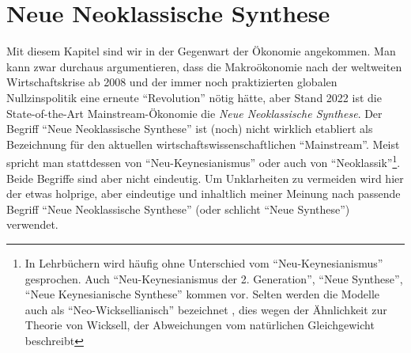 %
%
%

\chapter{Neue Neoklassische Synthese}
\label{Neue Neoklassische Synthese}

Mit diesem Kapitel sind wir in der Gegenwart der Ökonomie angekommen. Man kann zwar durchaus argumentieren, dass die Makroökonomie nach der weltweiten Wirtschaftskrise ab 2008 und der immer noch praktizierten globalen Nullzinspolitik eine erneute "`Revolution"' nötig hätte, aber Stand 2022 ist die State-of-the-Art Mainstream-Ökonomie die \textit{Neue Neoklassische Synthese}. Der Begriff "`Neue Neoklassische Synthese"' ist (noch) nicht wirklich etabliert als Bezeichnung für den aktuellen wirtschaftswissenschaftlichen "`Mainstream"'. Meist spricht man stattdessen von "`Neu-Keynesianismus"' oder auch von "`Neoklassik"'\footnote{In Lehrbüchern wird häufig ohne Unterschied vom "`Neu-Keynesianismus"' gesprochen. Auch "`Neu-Keynesianismus der 2. Generation"', "`Neue Synthese"', "`Neue Keynesianische Synthese"'  kommen vor. Selten werden die Modelle auch als "`Neo-Wicksellianisch"' bezeichnet \parencite[S. 28]{Gali2007}, dies wegen der Ähnlichkeit zur Theorie von Wicksell, der Abweichungen vom natürlichen Gleichgewicht beschreibt}. Beide Begriffe sind aber nicht eindeutig. Um Unklarheiten zu vermeiden wird hier der etwas holprige, aber eindeutige und inhaltlich meiner Meinung nach passende Begriff "`Neue Neoklassische Synthese"' (oder schlicht "`Neue Synthese"') verwendet.

